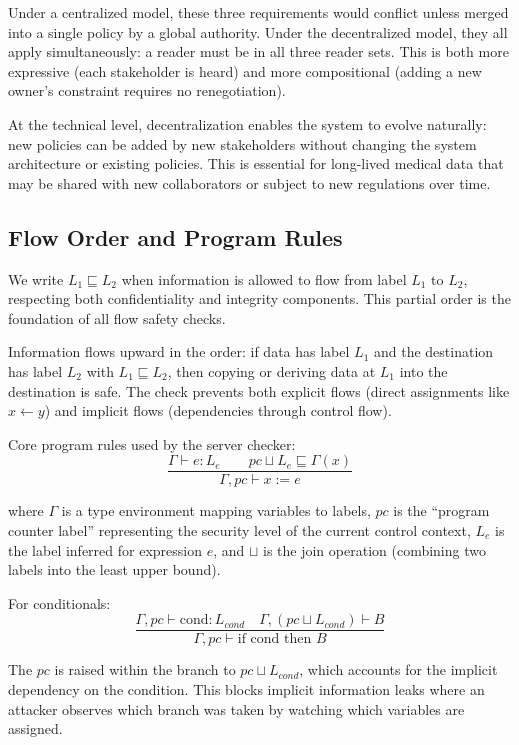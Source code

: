 Under a centralized model, these three requirements would conflict unless merged into a single policy by a global authority. Under the decentralized model, they all apply simultaneously: a reader must be in all three reader sets. This is both more expressive (each stakeholder is heard) and more compositional (adding a new owner's constraint requires no renegotiation).

At the technical level, decentralization enables the system to evolve naturally: new policies can be added by new stakeholders without changing the system architecture or existing policies. This is essential for long-lived medical data that may be shared with new collaborators or subject to new regulations over time.

\subsection{Flow Order and Program Rules}

We write $L_1 \sqsubseteq L_2$ when information is allowed to flow from label $L_1$ to $L_2$, respecting both confidentiality and integrity components. This partial order is the foundation of all flow safety checks.

Information flows upward in the order: if data has label $L_1$ and the destination has label $L_2$ with $L_1 \sqsubseteq L_2$, then copying or deriving data at $L_1$ into the destination is safe. The check prevents both explicit flows (direct assignments like $x \leftarrow y$) and implicit flows (dependencies through control flow).

Core program rules used by the server checker:
\[
\frac{\Gamma \vdash e : L_e \qquad pc \sqcup L_e \sqsubseteq \Gamma(x)}{\Gamma,pc \vdash x := e}
\]

where $\Gamma$ is a type environment mapping variables to labels, $pc$ is the ``program counter label'' representing the security level of the current control context, $L_e$ is the label inferred for expression $e$, and $\sqcup$ is the join operation (combining two labels into the least upper bound).

For conditionals:
\[
\frac{\Gamma, pc \vdash \text{cond} : L_{cond} \quad \Gamma, (pc \sqcup L_{cond}) \vdash B}{\Gamma, pc \vdash \text{if cond then } B}
\]

The $pc$ is raised within the branch to $pc \sqcup L_{cond}$, which accounts for the implicit dependency on the condition. This blocks implicit information leaks where an attacker observes which branch was taken by watching which variables are assigned.

